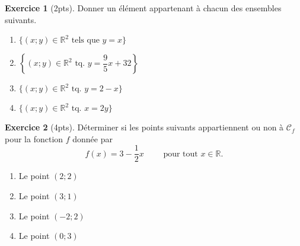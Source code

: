 \documentclass[12pt]{paper}
\theoremstyle{theorem}
\theoremstyle{definition}
\newtheorem{ex}{Exercice}
\newcommand{\C}{\mathcal{C}}
\newcommand{\R}{\mathbb{R}}
\newcommand{\exe}[2]{
		\begin{ex} #1  \end{ex}
		\begin{sol} #2 \end{sol}
	}
\newcommand{\exe}[2]{
		\begin{ex} #1  \end{ex}
	}
\begin{document}
\exe{[2pts]
	Donner un élément appartenant à chacun des ensembles suivants.
		\begin{multicols}{2}
		\begin{enumerate}
			\item $\{ (x;y) \in \R^2 \text{ tels que } y=x \}$
			\item $\left\{ (x;y) \in \R^2 \text{ tq. } y = \dfrac95 x + 32 \right\}$
			\item $\{ (x;y) \in \R^2 \text{ tq. } y=2-x \}$
			\item $\{ (x;y) \in \R^2 \text{ tq. } x=2y \}$
		\end{enumerate}
		\end{multicols}
}{}

\exe{[4pts]
	Déterminer si les points suivants appartiennent ou non à $\C_f$ pour la fonction $f$ donnée par
		\[ f(x) =3 - \dfrac12x \qquad \text{ pour tout } x\in\R. \]
	\begin{multicols}{2}
	\begin{enumerate}
		\item Le point $(2;2)$
		\item Le point $(3 ; 1)$
		\item Le point $(-2 ; 2)$
		\item Le point $(0;3)$
	\end{enumerate}
	\end{multicols}
}{}


\newpage
\end{document}
